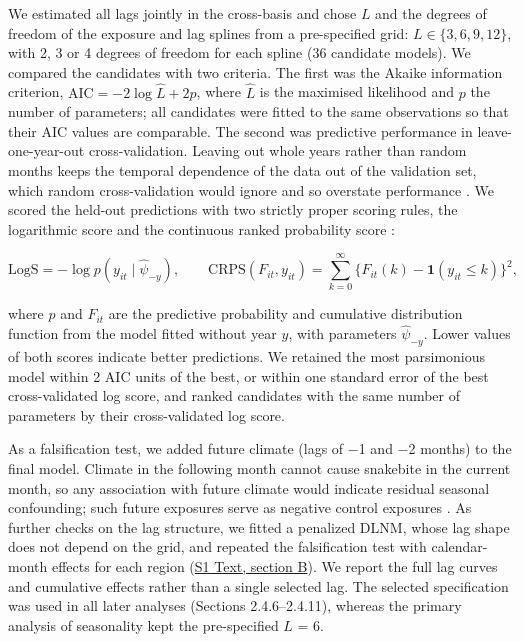 \documentclass[11pt,a4paper]{article}
\begin{document}
We estimated all lags jointly in the cross-basis and chose \(L\) and the degrees of freedom of the exposure and lag splines from a pre-specified grid: \(L \in \lbrace 3, 6, 9, 12\rbrace\), with 2, 3 or 4 degrees of freedom for each spline (36 candidate models). We compared the candidates with two criteria. The first was the Akaike information criterion, \(\mathrm{AIC} = -2\log \hat{L} + 2p\), where \(\hat{L}\) is the maximised likelihood and \(p\) the number of parameters; all candidates were fitted to the same observations so that their AIC values are comparable. The second was predictive performance in leave-one-year-out cross-validation. Leaving out whole years rather than random months keeps the temporal dependence of the data out of the validation set, which random cross-validation would ignore and so overstate performance \cite{ref37}. We scored the held-out predictions with two strictly proper scoring rules, the logarithmic score and the continuous ranked probability score \cite{ref38}:

\[\mathrm{LogS} = -\log p(y_{it} \mid \hat{\psi}_{-y}), \qquad \mathrm{CRPS}(F_{it}, y_{it}) = \sum_{k=0}^{\infty} \big\lbrace F_{it}(k) - \mathbf{1}(y_{it} \le k)\big\rbrace^2,\]

where \(p\) and \(F_{it}\) are the predictive probability and cumulative distribution function from the model fitted without year \(y\), with parameters \(\hat{\psi}_{-y}\). Lower values of both scores indicate better predictions. We retained the most parsimonious model within 2 AIC units of the best, or within one standard error of the best cross-validated log score, and ranked candidates with the same number of parameters by their cross-validated log score.

As a falsification test, we added future climate (lags of −1 and −2 months) to the final model. Climate in the following month cannot cause snakebite in the current month, so any association with future climate would indicate residual seasonal confounding; such future exposures serve as negative control exposures \cite{ref39}. As further checks on the lag structure, we fitted a penalized DLNM, whose lag shape does not depend on the grid, and repeated the falsification test with calendar-month effects for each region (\hyperref[s1text-b]{S1 Text, section B}). We report the full lag curves and cumulative effects rather than a single selected lag. The selected specification was used in all later analyses (Sections 2.4.6--2.4.11), whereas the primary analysis of seasonality kept the pre-specified \(L\) = 6.
\end{document}
